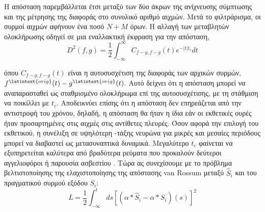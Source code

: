 \documentclass[12pt]{report}
\begin{document}
Η απόσταση παρεμβάλλεται έτσι μεταξύ των δύο άκρων της ανίχνευσης σύμπτωσης και της μέτρησης της διαφοράς στο συνολικό αριθμό αιχμών. Μετά το φιλτράρισμα, οι συρμοί αιχμών αφήνουν ένα ποσό $N+M$ όρων.
Η αλλαγή των μεταβλητών ολοκλήρωσης οδηγεί σε μια εναλλακτική έκφραση για την απόσταση,
\begin{equation}
D^{2}(f, g)=\frac{1}{2} \int_{-\infty}^{\infty} C_{f-g, f-g}(t) e^{-|t| t_{c}} d t
\end{equation}

όπου $C_{f-g, f-g}(t)$ είναι η αυτοσυσχέτιση της διαφοράς των αρχικών συρμών, $f^{\latintext {orig }}(t)-g^{\latintext {orig }}(t) .$ Αυτό δείχνει ότι η απόσταση μπορεί να αναπαρασταθεί ως σταθμισμένο ολοκλήρωμα επί της αυτοσυσχέτισης, με τη στάθμιση να ποικίλλει με $t_{c}$. Αποδεικνύει επίσης ότι η απόσταση δεν επηρεάζεται από την αντιστροφή του χρόνου, δηλαδή, η απόσταση θα ήταν η ίδια εάν οι εκθετικές ουρές ήταν προσαρτημένες στις αιχμές στις αντίθετες πλευρές. Όσον αφορά την επιλογή του εκθετικού, η συνέλιξη σε υψηλότερη -τάξης νευρώνα για μικρές και μεσαίες περιόδους μπορεί να διαβαστεί ως μετασυναπτικά δυναμικά. Μεγαλύτερο $t_{c}$ φαίνεται να εξυπηρετείται καλύτερα από βραδύτερα ρεύματα που προκαλούν δεύτεροι αγγελιοφόροι ή παρουσία ασβεστίου .
Τώρα ας συνεχίσουμε με το πρόβλημα βελτιστοποίησης της ελαχιστοποίησης της απόστασης \textlatin{van Rossum} \cite {rossum2001} μεταξύ $\hat{S}_{i}$ και του πραγματικού συρμού εξόδου $S_{i}$:
\begin{equation}
L=\frac{1}{2} \int_{-\infty}^{t} d s\left[\left(\alpha * \hat{S}_{i}-\alpha * S_{i}\right)(s)\right]^{2}
\end{equation}
\end{document}
